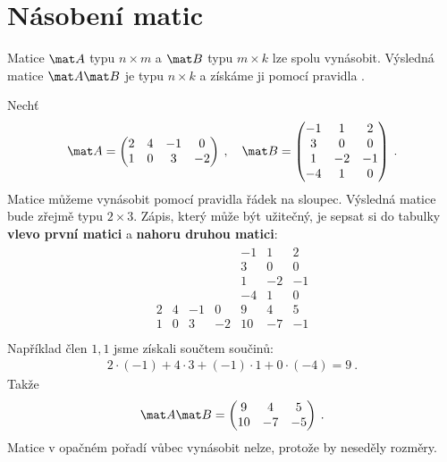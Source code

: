 \section*{Násobení matic}

Matice $\mat A$ typu $n \times m$ a $\mat B$ typu $m \times k$ lze spolu vynásobit. Výsledná matice $\mat A \mat B$ je typu $n \times k$ a získáme ji pomocí pravidla .

\begin{example}
    Nechť
    \begin{align}
        \mat A = \begin{pmatrix}
            2 & 4 & -1 & 0 \\
            1 & 0 & 3 & -2
        \end{pmatrix}
        \:, \quad
        \mat B = \begin{pmatrix}
            -1 & 1 & 2 \\
            3 & 0 & 0 \\
            1 & -2 & -1 \\
            -4 & 1 & 0 \\
        \end{pmatrix} \:.
    \end{align}
    Matice můžeme vynásobit pomocí pravidla řádek na sloupec. Výsledná matice bude zřejmě typu $2 \times 3$. Zápis, který může být užitečný, je sepsat si do tabulky \textbf{vlevo první matici} a \textbf{nahoru druhou matici}:
    \begin{align}
        \begin{array}{rrrr|rrr}
            &&&&-1 & 1 & 2 \\
            &&&&3 & 0 & 0 \\
            &&&&1 & -2 & -1 \\
            &&&&-4 & 1 & 0 \\
            \hline
            2 & 4 & -1 & 0 &     9 & 4 & 5\\
            1 & 0 & 3 & -2 &     10 & -7 & -1\\
        \end{array}
    \end{align}
    Například člen $1,1$ jsme získali součtem součinů: 
    \begin{align}
        2 \cdot (-1) + 4 \cdot 3 + (-1) \cdot 1 + 0 \cdot (-4) = 9 \:.
    \end{align}
    Takže \begin{align}
        \mat A \mat B = \begin{pmatrix}
            9 & 4 & 5 \\
            10 & -7 & -5
        \end{pmatrix} \:.
    \end{align}
    Matice v opačném pořadí vůbec vynásobit nelze, protože by neseděly rozměry.
\end{example}

